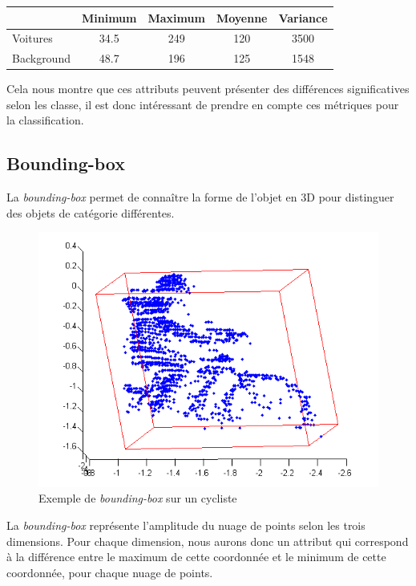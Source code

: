 		\begin{center}
			\begin{tabular}{|l||c|c|c|c|}
			  \hline
			  & Minimum & Maximum & Moyenne & Variance \\
			  \hline
			  Voitures & 34.5 & 249 & 120 & 3500 \\
			  Background & 48.7 & 196 & 125 & 1548 \\
			  \hline
			\end{tabular}
		\end{center}


		Cela nous montre que ces attributs peuvent présenter des différences significatives selon les classe, il est donc intéressant de prendre en compte ces métriques pour la classification.

	\subsection{Bounding-box}
		La \emph{bounding-box} permet de connaître la forme de l'objet en 3D pour distinguer des objets de catégorie différentes.

		\begin{figure}[H]
			\centering
			\includegraphics[scale=0.6]{images/bounding_box_cyclist_2.png}
			\caption{Exemple de \emph{bounding-box} sur un cycliste}
			\label{fig:image}
		\end{figure}

		La \emph{bounding-box} représente l'amplitude du nuage de points selon les trois dimensions. Pour chaque dimension, nous aurons donc un attribut qui correspond à la différence entre le maximum de cette coordonnée et le minimum de cette coordonnée, pour chaque nuage de points.\\

